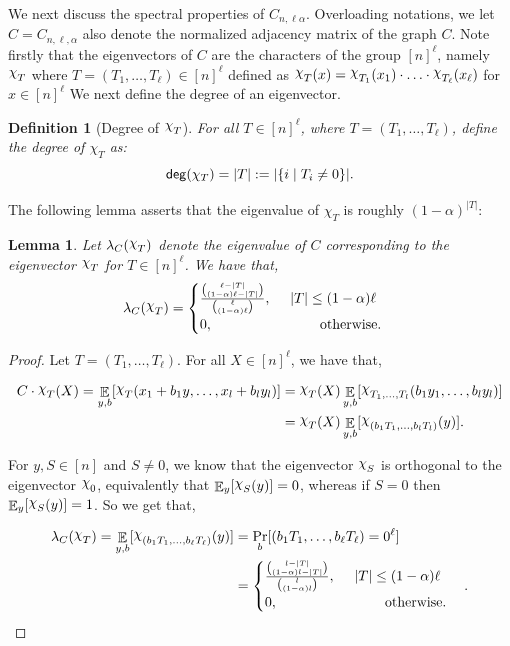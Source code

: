 \documentclass[11pt]{article}
\DeclareMathOperator*{\E}{\mathbb{E}}
\def \Chi {\raisebox{2pt}{$\chi$}}
\newtheorem{lemma}[theorem]{Lemma}
\newtheorem{definition}[theorem]{Definition}
\theoremstyle{definition}
\begin{document}
We next discuss the spectral properties of $C_{n,\ell\alpha}$. Overloading notations, we let $C = C_{n,\ell,\alpha}$ also denote the normalized adjacency matrix of the graph $C$. Note firstly that the eigenvectors of $C$ are the characters of the group $[n]^\ell$, namely $\raisebox{2pt}{$\chi$}_{T}$ where $T = (T_1,\ldots,T_\ell) \in [n]^{\ell}$ defined as $\Chi_T(x) = \Chi_{T_1}(x_1) \cdot \ldots \cdot \Chi_{T_{\ell}}(x_\ell)$ for $x\in [n]^{\ell}$ 
We next define the degree of an eigenvector.

\begin{definition}[Degree of $\Chi_T$]
For all $T \in [n]^\ell$, where $T = (T_1,\ldots,T_\ell)$, define the degree of $\chi_{T}$ as:
$${\sf deg}(\chi_T) = |T| := |\{i \mid T_i \neq 0\}|.$$
\end{definition}

The following lemma asserts that the eigenvalue of $\chi_T$ is roughly $(1-\alpha)^{|T|}$:
\begin{lemma}\label{lem:eigenval}
Let $\lambda_C(\Chi_T)$ denote the eigenvalue of $C$ corresponding to the eigenvector $\Chi_T$ for $T \in [n]^\ell$. We have that, 
$$
\lambda_{C}(\raisebox{2pt}{$\chi$}_T) = 
\begin{cases}
\frac{\binom{\ell - |T|}{(1 - \alpha)\ell - |T|}}{\binom{\ell}{(1 - \alpha)\ell}}, ~~~~|T| \leq (1 - \alpha)\ell\\
0, ~~~~~~~~~~~~~~~~~~~~~~~\text{otherwise.} 
\end{cases}
$$
\end{lemma}

\begin{proof}
Let $T = (T_1, \ldots, T_\ell)$. For all $X \in [n]^\ell$, we have that,

\begin{align*}
C \cdot \Chi_T(X) = \E_{y,b}[\Chi_T(x_1+b_1 y, \ldots, x_l + b_l y_l)] 
&= \Chi_T(X) \E_{y,b}[\Chi_{T_1,\ldots,T_l}(b_1y_1,\ldots,b_ly_l)] \\
&= \Chi_T(X) \E_{y,b}[\Chi_{(b_1 T_1,\ldots,b_l T_l)}(y)].
\end{align*}

For $y,S \in [n]$ and $S \neq 0$, we know that the eigenvector $\Chi_S$ is orthogonal to the eigenvector $\Chi_0$, equivalently that $\E_y[\Chi_S(y)] = 0$, whereas if $S = 0$ then $\E_y[\Chi_S(y)] = 1$. So we get that,

\begin{align*}
\lambda_{C}(\Chi_T) = \E_{y,b}[\Chi_{(b_1 T_1,\ldots,b_\ell T_\ell)}(y)] 
&= \Pr_b[(b_1T_1,\ldots,b_\ell T_\ell) = 0^{\ell}] \\
&= \begin{cases}
\frac{\binom{l - |T|}{(1 - \alpha)l - |T|}}{\binom{l}{(1 - \alpha)l}}, ~~~~|T| \leq (1 - \alpha)\ell\\
0, ~~~~~~~~~~~~~~~~~~~~~~~\text{otherwise.} 
\end{cases}.
\end{align*}
\end{proof}
\end{document}
